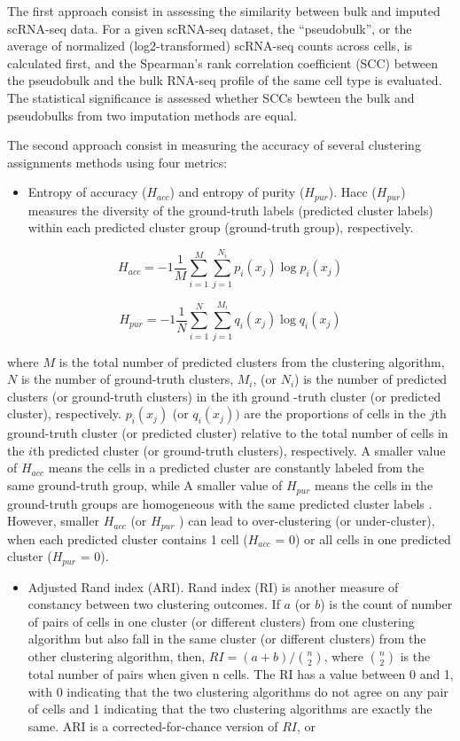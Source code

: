 \documentclass[
]{book}
\providecommand{\tightlist}{%
  \setlength{\itemsep}{0pt}\setlength{\parskip}{0pt}}
\begin{document}
The first approach consist in assessing the similarity between bulk and imputed scRNA-seq data. For a given scRNA-seq dataset, the ``pseudobulk'', or the average of normalized (log2-transformed) scRNA-seq counts across cells, is calculated first, and the Spearman's rank correlation coefficient (SCC) between the pseudobulk and the bulk RNA-seq profile of the same cell type is evaluated. The statistical significance is assessed whether SCCs bewteen the bulk and pseudobulks from two imputation methods are equal.

The second approach consist in measuring the accuracy of several clustering assignments methods using four metrics:

\begin{itemize}
\tightlist
\item
  Entropy of accuracy (\(H_{acc}\)) and entropy of purity (\(H_{pur}\)). Hacc (\(H_{pur}\)) measures the diversity of the ground-truth labels (predicted cluster labels) within each predicted cluster group (ground-truth group), respectively.
\end{itemize}

\[H_{acc}=-1\frac{1}{M}\sum_{i=1}^{M}\sum_{j=1}^{N_{i}}p_{i}(x_{j})\log{p_{i}(x_{j})}\]

\[H_{pur}=-1\frac{1}{N}\sum_{i=1}^{N}\sum_{j=1}^{M_{i}}q_{i}(x_{j})\log{q_{i}(x_{j})}\]

where \(M\) is the total number of predicted clusters from the clustering algorithm, \(N\) is the number of ground-truth clusters, \(M_{i}\), (or \(N_{i}\)) is the number of predicted clusters (or ground-truth clusters) in the ith ground -truth cluster (or predicted cluster), respectively. \(p_{i}(x_{j})\) (or \(q_{i}(x_{j}))\) are the proportions of cells in the \(j\)th ground-truth cluster (or predicted cluster) relative to the total number of cells in the \(i\)th predicted cluster (or ground-truth clusters), respectively. A smaller value of \(H_{acc}\) means the cells in a predicted cluster are constantly labeled from the same ground-truth group, while A smaller value of \(H_{pur}\) means the cells in the ground-truth groups are homogeneous with the same predicted cluster labels \citep{RN44}. However, smaller \(H_{acc}\) (or \(H_{pur}\) ) can lead to over-clustering (or under-cluster), when each predicted cluster contains 1 cell (\(H_{acc}\) = 0) or all cells in one predicted cluster (\(H_{pur}\) = 0).

\begin{itemize}
\tightlist
\item
  Adjusted Rand index (ARI). Rand index (RI) is another measure of constancy between two clustering outcomes. If \(a\) (or \(b\)) is the count of number of pairs of cells in one cluster (or different clusters) from one clustering algorithm but also fall in the same cluster (or different clusters) from the other clustering algorithm, then, \(RI=(a+b)/{\binom{n}{2}}\), where \(\binom{n}{2}\) is the total number of pairs when given n cells. The RI has a value between 0 and 1, with 0 indicating that the two clustering algorithms do not agree on any pair of cells and 1 indicating that the two clustering algorithms are exactly the same. ARI is a corrected-for-chance version of \(RI\), or
\end{itemize}
\end{document}
